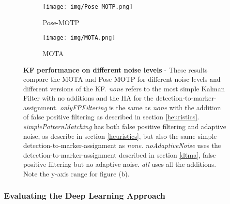 \documentclass[12pt,a4paper]{article}
\begin{document}
\begin{figure}[!htbp]
	\begin{center}
		\begin{subfigure}[b]{0.495\textwidth}
			\label{NN_mlp_encoder}
			\texttt{[image: img/Pose-MOTP.png]}
			\caption{Pose-MOTP}
		\end{subfigure}
		\begin{subfigure}[b]{0.495\textwidth}
			\label{NN_lstm_encoder}
			\texttt{[image: img/MOTA.png]}
			\caption{MOTA}
		\end{subfigure}

	\end{center}
	\caption{\textbf{KF performance on different noise levels} - These results compare the MOTA and Pose-MOTP for different noise levels and different versions of the KF. \emph{none} refers to the most simple Kalman Filter with no additions and the HA for the detection-to-marker-assignment. \emph{onlyFPFiltering} is the same as \emph{none} with the addition of false positive filtering as described in section \ref{heuristics}. \emph{simplePatternMatching} has both false positive filtering and adaptive noise, as describe in section \ref{heuristics}, but also the same simple detection-to-marker-assignment as \emph{none}. \emph{noAdaptiveNoise} uses the detection-to-marker-assignment described in section \ref{dtma}, false positive filtering but no adaptive noise. \emph{all} uses all the additions. Note the y-axis range for figure (b).}
	\label{KF_mot_metrics}
\end{figure}

\subsubsection{Evaluating the Deep Learning Approach}
\label{results_dl}
\end{document}
